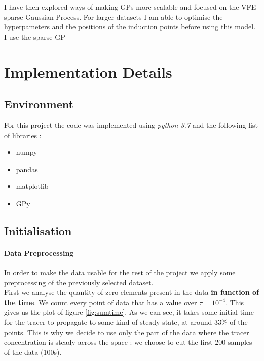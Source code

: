 I have then explored ways of making GPs more scalable and focused on the VFE sparse Gaussian Process. For larger datasets I am able to optimise the hyperpameters and the positions of the induction points before using this model.  \\

I use the sparse GP 

\section{Implementation Details}

\subsection{Environment}

For this project the code was implemented using \textit{python 3.7} and the following list of libraries : 

\begin{itemize}
	\item numpy
	\item pandas
	\item matplotlib
	\item GPy
\end{itemize}


\subsection{Initialisation}


\paragraph{Data Preprocessing}

In order to make the data usable for the rest of the project we apply some preprocessing of the previously selected dataset. \\

First we analyse the quantity of zero elements present in the data \textbf{in function of the time}. We count every point of data that has a value over $\tau = 10^{-4}$. This gives us the plot of figure \ref{fig:sumtime}. As we can see, it takes some initial time for the tracer to propagate to some kind of steady state, at around 33\% of the points. This is why we decide to use only the part of the data where the tracer concentration is steady across the space : we choose to cut the first 200 samples of the data (100s). \\

